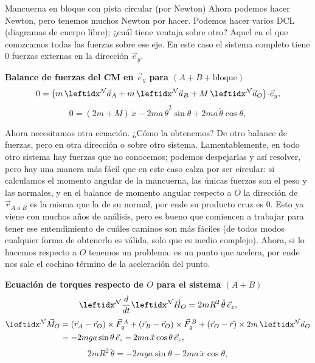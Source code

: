 \begin{solucion}{Mancuerna en bloque con pista circular (por Newton)}
Ahora podemos hacer Newton, pero tenemos muchos Newton por hacer. Podemos hacer varios DCL (diagramas de cuerpo libre); ¿cuál tiene ventaja sobre otro? Aquel en el que conozcamos todas las fuerzas sobre ese eje. En este caso el sistema completo tiene 0 fuerzas externas en la dirección $\vec{e}_y$.

\textbf{Balance de fuerzas del CM en $\vec{e}_y$ para $(A+B+\text{bloque})$}
$$0 = \left( m\,\marc{\vec{a}_A}{N}{} + m\,\marc{\vec{a}_B}{N}{} + M\,\marc{\vec{a}_O}{N}{} \right)\!\cdot\!\vec{e}_y,$$
$$0 = (2m+M)\,\ddot{x} - 2ma\,\dot{\theta}^2\sin\theta + 2ma\,\ddot{\theta}\cos\theta,$$

Ahora necesitamos otra ecuación. ¿Cómo la obtenemos? De otro balance de fuerzas, pero en otra dirección o sobre otro sistema. Lamentablemente, en todo otro sistema hay fuerzas que no conocemos; podemos despejarlas y así resolver, pero hay una manera más fácil que en este caso calza por ser circular: si calculamos el momento angular de la mancuerna, las únicas fuerzas son el peso y las normales, y en el balance de momento angular respecto a $O$ la dirección de $\vec{r}_{A\text{ o }B}$ es la misma que la de su normal, por ende su producto cruz es 0. Esto ya viene con muchos años de análisis, pero es bueno que comiencen a trabajar para tener ese entendimiento de cuáles caminos son más fáciles (de todos modos cualquier forma de obtenerlo es válida, solo que es medio complejo). Ahora, si lo hacemos respecto a $O$ tenemos un problema: es un punto que acelera, por ende nos sale el cochino término de la aceleración del punto.

\textbf{Ecuación de torques respecto de $O$ para el sistema $(A+B)$}
$$\der{\marc{\vec{H}_O}{N}{}}{N}{} = 2mR^2\,\ddot{\theta}\,\vec{e}_z,$$
$$\begin{aligned}
\marc{\vec{M}_O}{N}{}
&= (\vec{r}_A-\vec{r}_O)\times\vec{F}^{\,A}_g + (\vec{r}_B-\vec{r}_O)\times\vec{F}^{\,B}_g + (\vec{r}_O-\vec{r})\times 2m\,\marc{\vec{a}_O}{N}{}\\
&= -2mga\sin\theta\,\vec{e}_z - 2ma\,\ddot{x}\cos\theta\,\vec{e}_z,
\end{aligned}$$
$$2mR^2\,\ddot{\theta} = -2mga\sin\theta - 2ma\,\ddot{x}\cos\theta,$$


\end{solucion}
